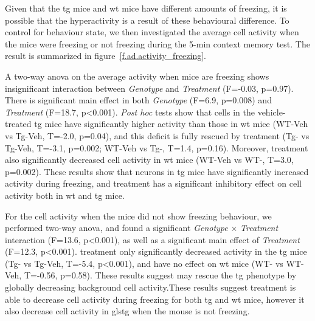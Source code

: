 Given that the \gls{tg} mice and \gls{wt} mice have different amounts of freezing, it is possible that the hyperactivity is a result of these behavioural difference. To control for behaviour state, we then investigated the average cell activity when the mice were freezing or not freezing during the 5-min context memory test. The result is summarized in figure~\ref{f.ad.activity_freezing}.  

A two-way \gls{anova} on the average activity when mice are freezing shows insignificant interaction between \textit{Genotype} and \textit{Treatment} (F=-0.03, p=0.97). There is significant main effect in both \textit{Genotype} (F=6.9, p=0.008) and \textit{Treatment} (F=18.7, p<0.001). \textit{Post hoc} tests show that cells in the vehicle-treated \gls{tg} mice have significantly higher activity than those in \gls{wt} mice (WT-Veh vs Tg-Veh, T=-2.0, p=0.04), and this deficit is fully rescued by \tglu{} treatment (Tg-\glu{} vs Tg-Veh, T=-3.1, p=0.002; WT-Veh vs Tg-\glu{}, T=1.4, p=0.16). Moreover, \tglu{} treatment also significantly decreased cell activity in \gls{wt} mice (WT-Veh vs WT-\glu{}, T=3.0, p=0.002). These results show that neurons in \Gls{tg} mice have significantly increased activity during freezing, and \tglu{} treatment has a significant inhibitory effect on cell activity both in \gls{wt} and \gls{tg} mice. 

For the cell activity when the mice did not show freezing behaviour, we performed two-way \gls{anova}, and found a significant \textit{Genotype} $\times$ \textit{Treatment} interaction (F=13.6, p<0.001), as well as a significant main effect of \textit{Treatment} (F=12.3, p<0.001). \tglu{} treatment only significantly decreased activity in the \gls{tg} mice (Tg-\glu{} vs Tg-Veh, T=-5.4, p<0.001), and have no effect on \gls{wt} mice (WT-\glu{} vs WT-Veh, T=-0.56, p=0.58). These results suggest \tglu{} may rescue the \gls{tg} phenotype by globally decreasing background cell activity.These results suggest \tglu{} treatment is able to decrease cell activity during freezing for both \gls{tg} and \gls{wt} mice, however it also decrease cell activity in gls{tg} when the mouse is not freezing.


